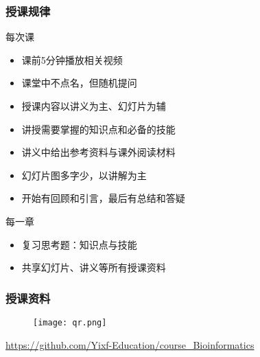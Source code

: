 \begin{frame}
  \frametitle{授课规律}
  \begin{block}{每次课}
    \begin{itemize}
      \item 课前5分钟播放相关视频
      \item 课堂中不点名，但随机提问
      \item 授课内容以讲义为主、幻灯片为辅
      \item 讲授需要掌握的知识点和必备的技能
      \item 讲义中给出参考资料与课外阅读材料
      \item 幻灯片图多字少，以讲解为主
      \item 开始有回顾和引言，最后有总结和答疑
    \end{itemize}
  \end{block}
  \pause
  \begin{block}{每一章}
    \begin{itemize}
      \item 复习思考题：知识点与技能
      \item 共享幻灯片、讲义等所有授课资料
    \end{itemize}
  \end{block}
\end{frame}

\begin{frame}
  \frametitle{授课资料}
  \begin{figure}
    \centering
    \texttt{[image: qr.png]}
  \end{figure}
  \begin{center}
    \href{https://github.com/Yixf-Education/course_Bioinformatics}{https://github.com/Yixf-Education/course\_Bioinformatics}
  \end{center}
\end{frame}

%


